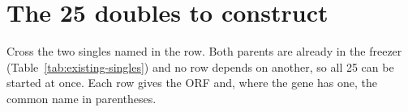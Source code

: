 
\section{The 25 doubles to construct}\label{sec:doubles}

Cross the two singles named in the row. Both parents are already in the freezer
(Table~\ref{tab:existing-singles}) and no row depends on another, so all 25 can
be started at once. Each row gives the ORF and, where the gene has one, the
common name in parentheses.


